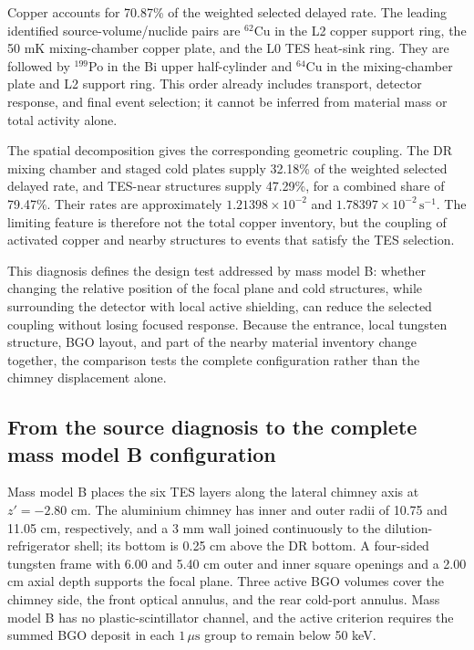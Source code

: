 \documentclass[11pt]{article}
\newcommand{\cps}{\ensuremath{\,\mathrm{s^{-1}}}}
\begin{document}
Copper accounts for 70.87\% of the weighted selected delayed rate. The leading identified source-volume/nuclide pairs are $^{62}$Cu in the L2 copper support ring, the 50 mK mixing-chamber copper plate, and the L0 TES heat-sink ring. They are followed by $^{199}$Po in the Bi upper half-cylinder and $^{64}$Cu in the mixing-chamber plate and L2 support ring. This order already includes transport, detector response, and final event selection; it cannot be inferred from material mass or total activity alone.

The spatial decomposition gives the corresponding geometric coupling. The DR mixing chamber and staged cold plates supply 32.18\% of the weighted selected delayed rate, and TES-near structures supply 47.29\%, for a combined share of 79.47\%. Their rates are approximately $1.21398\times10^{-2}$ and $1.78397\times10^{-2}\cps$. The limiting feature is therefore not the total copper inventory, but the coupling of activated copper and nearby structures to events that satisfy the TES selection.

This diagnosis defines the design test addressed by mass model B: whether changing the relative position of the focal plane and cold structures, while surrounding the detector with local active shielding, can reduce the selected coupling without losing focused response. Because the entrance, local tungsten structure, BGO layout, and part of the nearby material inventory change together, the comparison tests the complete configuration rather than the chimney displacement alone.

\FloatBarrier

\subsection{From the source diagnosis to the complete mass model B configuration}
\label{subsec:optimized_shield_results}

Mass model B places the six TES layers along the lateral chimney axis at $z'=-2.80$ cm. The aluminium chimney has inner and outer radii of 10.75 and 11.05 cm, respectively, and a 3 mm wall joined continuously to the dilution-refrigerator shell; its bottom is 0.25 cm above the DR bottom. A four-sided tungsten frame with 6.00 and 5.40 cm outer and inner square openings and a 2.00 cm axial depth supports the focal plane. Three active BGO volumes cover the chimney side, the front optical annulus, and the rear cold-port annulus. Mass model B has no plastic-scintillator channel, and the active criterion requires the summed BGO deposit in each $1\,\mu\mathrm{s}$ group to remain below 50 keV.
\end{document}
